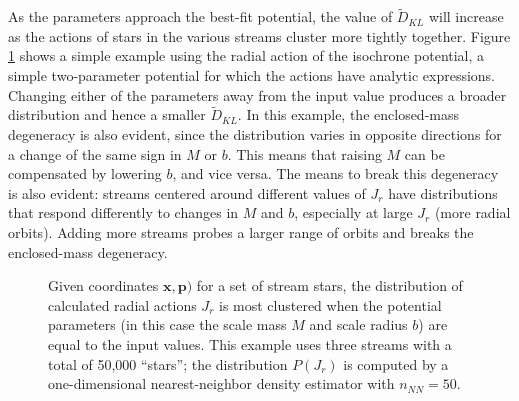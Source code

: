 \documentclass{emulateapj}
\begin{document}
As the parameters approach the best-fit potential, the value of $\tilde{D}_{KL}$ will increase as the actions of stars in the various streams cluster more tightly together. Figure \ref{fig:actionClustering} shows a simple example using the radial action of the isochrone potential, a simple two-parameter potential for which the actions have analytic expressions. Changing either of the parameters away from the input value produces a broader distribution and hence a smaller $\tilde{D}_{KL}$. In this example, the enclosed-mass degeneracy is also evident, since the distribution varies in opposite directions for a change of the same sign in $M$ or $b$. This means that raising $M$ can be compensated by lowering $b$, and vice versa. The means to break this degeneracy is also evident: streams centered around different values of $J_r$ have distributions that respond differently to changes in $M$ and $b$, especially at large $J_r$ (more radial orbits). Adding more streams probes a larger range of orbits and breaks the enclosed-mass degeneracy.
\begin{figure}
\caption{Given coordinates $\mathbf{x},\mathbf{p})$ for a set of stream stars, the distribution of calculated radial actions $J_r$ is most clustered when the potential parameters (in this case the scale mass $M$ and scale radius $b$) are equal to the input values. This example uses three streams with a total of 50,000 ``stars''; the distribution $P(J_r)$ is computed by a one-dimensional nearest-neighbor density estimator with $n_{NN}=50$.}
\label{fig:actionClustering}
\end{figure}
\end{document}

